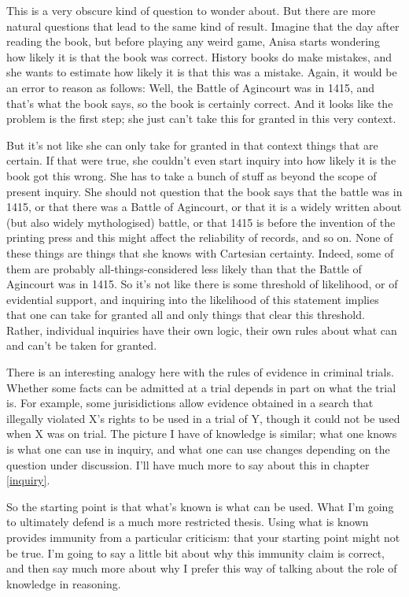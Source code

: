 \documentclass[
  11pt,
]{book}
\begin{document}
This is a very obscure kind of question to wonder about. But there are more natural questions that lead to the same kind of result. Imagine that the day after reading the book, but before playing any weird game, Anisa starts wondering how likely it is that the book was correct. History books do make mistakes, and she wants to estimate how likely it is that this was a mistake. Again, it would be an error to reason as follows: Well, the Battle of Agincourt was in 1415, and that's what the book says, so the book is certainly correct. And it looks like the problem is the first step; she just can't take this for granted in this very context.

But it's not like she can only take for granted in that context things that are certain. If that were true, she couldn't even start inquiry into how likely it is the book got this wrong. She has to take a bunch of stuff as beyond the scope of present inquiry. She should not question that the book says that the battle was in 1415, or that there was a Battle of Agincourt, or that it is a widely written about (but also widely mythologised) battle, or that 1415 is before the invention of the printing press and this might affect the reliability of records, and so on. None of these things are things that she knows with Cartesian certainty. Indeed, some of them are probably all-things-considered less likely than that the Battle of Agincourt was in 1415. So it's not like there is some threshold of likelihood, or of evidential support, and inquiring into the likelihood of this statement implies that one can take for granted all and only things that clear this threshold. Rather, individual inquiries have their own logic, their own rules about what can and can't be taken for granted.

There is an interesting analogy here with the rules of evidence in criminal trials. Whether some facts can be admitted at a trial depends in part on what the trial is. For example, some jurisidictions allow evidence obtained in a search that illegally violated X's rights to be used in a trial of Y, though it could not be used when X was on trial. The picture I have of knowledge is similar; what one knows is what one can use in inquiry, and what one can use changes depending on the question under discussion. I'll have much more to say about this in chapter \ref{inquiry}.

So the starting point is that what's known is what can be used. What I'm going to ultimately defend is a much more restricted thesis. Using what is known provides immunity from a particular criticism: that your starting point might not be true. I'm going to say a little bit about why this immunity claim is correct, and then say much more about why I prefer this way of talking about the role of knowledge in reasoning.
\end{document}

